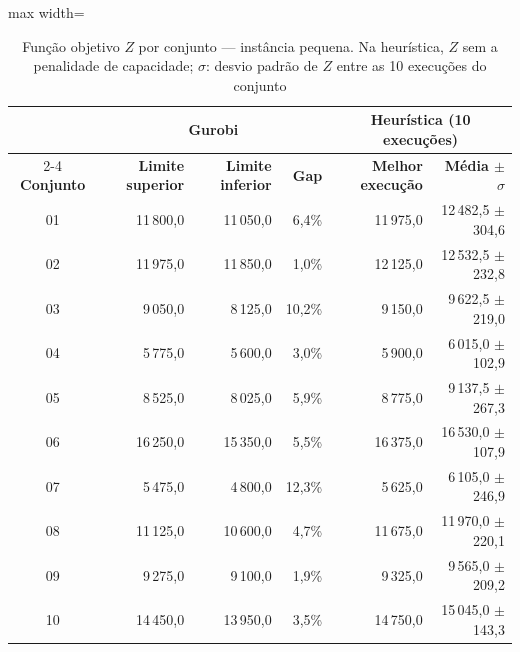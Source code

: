 \begin{table}[htbp]
    \caption{Função objetivo $Z$ por conjunto --- instância pequena. Na heurística, $Z$ sem a penalidade de capacidade; $\sigma$: desvio padrão de $Z$ entre as 10 execuções do conjunto}
    \label{tab:res-z-pequeno}
    \centering
    \begin{adjustbox}{max width=\textwidth}
    \begin{tabular}{crrrrr}
        \hline
        & \multicolumn{3}{c}{\textbf{Gurobi}} & \multicolumn{2}{c}{\textbf{Heurística (10 execuções)}} \\
        \cline{2-4} \cline{5-6}
        \textbf{Conjunto} & \textbf{Limite superior} & \textbf{Limite inferior} & \textbf{Gap} & \textbf{Melhor execução} & \textbf{Média $\pm$ $\sigma$} \\
        \hline
        01 & 11\,800,0 & 11\,050,0 & 6,4\% & 11\,975,0 & 12\,482,5 $\pm$ 304,6 \\
        02 & 11\,975,0 & 11\,850,0 & 1,0\% & 12\,125,0 & 12\,532,5 $\pm$ 232,8 \\
        03 & 9\,050,0 & 8\,125,0 & 10,2\% & 9\,150,0 & 9\,622,5 $\pm$ 219,0 \\
        04 & 5\,775,0 & 5\,600,0 & 3,0\% & 5\,900,0 & 6\,015,0 $\pm$ 102,9 \\
        05 & 8\,525,0 & 8\,025,0 & 5,9\% & 8\,775,0 & 9\,137,5 $\pm$ 267,3 \\
        06 & 16\,250,0 & 15\,350,0 & 5,5\% & 16\,375,0 & 16\,530,0 $\pm$ 107,9 \\
        07 & 5\,475,0 & 4\,800,0 & 12,3\% & 5\,625,0 & 6\,105,0 $\pm$ 246,9 \\
        08 & 11\,125,0 & 10\,600,0 & 4,7\% & 11\,675,0 & 11\,970,0 $\pm$ 220,1 \\
        09 & 9\,275,0 & 9\,100,0 & 1,9\% & 9\,325,0 & 9\,565,0 $\pm$ 209,2 \\
        10 & 14\,450,0 & 13\,950,0 & 3,5\% & 14\,750,0 & 15\,045,0 $\pm$ 143,3 \\
        \hline
    \end{tabular}
    \end{adjustbox}
\end{table}

